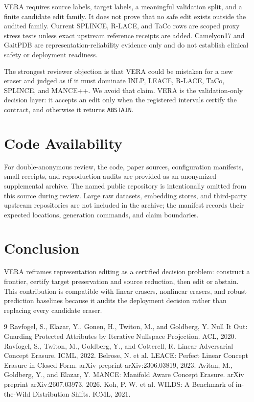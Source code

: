 \documentclass[letterpaper]{article}
\begin{document}
VERA requires source labels, target labels, a meaningful validation split, and a
finite candidate edit family. It does not prove that no safe edit exists
outside the audited family. Current SPLINCE, R-LACE, and TaCo rows are scoped
proxy stress tests unless exact upstream reference receipts are added.
Camelyon17 and GaitPDB are representation-reliability evidence only and do not
establish clinical safety or deployment readiness.

The strongest reviewer objection is that VERA could be mistaken for a new
eraser and judged as if it must dominate INLP, LEACE, R-LACE, TaCo, SPLINCE,
and MANCE++. We avoid that claim. VERA is the validation-only decision layer:
it accepts an edit only when the registered intervals certify the contract, and
otherwise it returns \texttt{ABSTAIN}.

\section{Code Availability}

For double-anonymous review, the code, paper sources, configuration manifests,
small receipts, and reproduction audits are provided as an anonymized
supplemental archive. The named public repository is intentionally omitted from
this source during review. Large raw datasets, embedding stores, and third-party
upstream repositories are not included in the archive; the manifest records
their expected locations, generation commands, and claim boundaries.

\section{Conclusion}

VERA reframes representation editing as a certified decision problem: construct
a frontier, certify target preservation and source reduction, then edit or
abstain. This contribution is compatible with linear erasers, nonlinear
erasers, and robust prediction baselines because it audits the deployment
decision rather than replacing every candidate eraser.

\begin{thebibliography}{9}
Ravfogel, S., Elazar, Y., Gonen, H., Twiton, M., and Goldberg, Y. Null It Out:
Guarding Protected Attributes by Iterative Nullspace Projection. ACL, 2020.
Ravfogel, S., Twiton, M., Goldberg, Y., and Cotterell, R. Linear Adversarial
Concept Erasure. ICML, 2022.
Belrose, N. et al. LEACE: Perfect Linear Concept Erasure in Closed Form. arXiv
preprint arXiv:2306.03819, 2023.
Avitan, M., Goldberg, Y., and Elazar, Y. MANCE: Manifold Aware Concept Erasure.
arXiv preprint arXiv:2607.03973, 2026.
Koh, P. W. et al. WILDS: A Benchmark of in-the-Wild Distribution Shifts. ICML,
2021.
\end{thebibliography}
\end{document}
